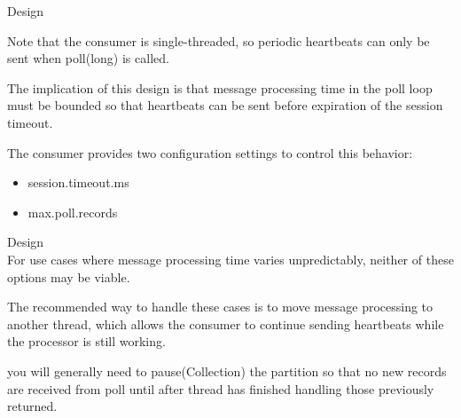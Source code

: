 \begin{frame}[plain,t]{Design} %
     \\
    \vspace{2ex}
    
    Note that the consumer is single-threaded, so periodic heartbeats can only be sent when poll(long) is called. 
    
    \vspace{2ex}
    
    The implication of this design is that message processing time in the poll loop must be bounded so that heartbeats can be sent before expiration of the session timeout.
    
    \vspace{2ex}
    The consumer provides two configuration settings to control this behavior:
    \begin{itemize}
         \item session.timeout.ms
        \item max.poll.records
    \end{itemize}


 
\end{frame}
\begin{frame}[plain,t]{Design} %
     \\
    \vspace{2ex}
For use cases where message processing time varies unpredictably, neither of these options may be viable. 

\vspace{2ex}
The recommended way to handle these cases is to move message processing to another thread, which allows the consumer to continue sending heartbeats while the processor is still working. 

\vspace{2ex}
you will generally need to pause(Collection) the partition so that no new records are received from poll until after thread has finished handling those previously returned.

\end{frame}
